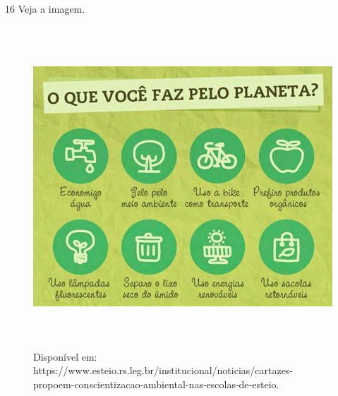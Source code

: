 

\num{16} Veja a imagem.

\begin{figure}[H]
\centering\includegraphics[width=5.90556in,height=4.73611in]{./imgSAEB_6_POR/media/image37.png}
\caption{Disponível em: https://www.esteio.rs.leg.br/institucional/noticias/cartazes-propoem-conscientizacao-ambiental-nas-escolas-de-esteio.}
\end{figure}

